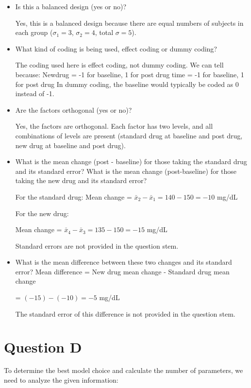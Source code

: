 \documentclass{article}
\begin{document}
\begin{itemize}
\setcounter{enumi}{2}
\item Is this a balanced design (yes or no)?

Yes, this is a balanced design because there are equal numbers of subjects in each group ($\sigma_1 = 3$, $\sigma_2 = 4$, total $\sigma = 5$).

\item What kind of coding is being used, effect coding or dummy coding?

The coding used here is effect coding, not dummy coding. We can tell because:
Newdrug = -1 for baseline, 1 for post drug
time = -1 for baseline, 1 for post drug
In dummy coding, the baseline would typically be coded as 0 instead of -1.

\item Are the factors orthogonal (yes or no)?

Yes, the factors are orthogonal. Each factor has two levels, and all combinations of levels are present (standard drug at baseline and post drug, new drug at baseline and post drug).

\item What is the mean change (post - baseline) for those taking the standard drug and its standard error? What is the mean change (post-baseline) for those taking the new drug and its standard error?

For the standard drug:
Mean change = $\bar{x}_2 - \bar{x}_1 = 140 - 150 = -10$ mg/dL

For the new drug:

Mean change = $\bar{x}_4 - \bar{x}_3 = 135 - 150 = -15$ mg/dL

Standard errors are not provided in the question stem.

\item What is the mean difference between these two changes and its standard error?
Mean difference = New drug mean change - Standard drug mean change

\hphantom{Mean difference} = $(-15) - (-10) = -5$ mg/dL

The standard error of this difference is not provided in the question stem.
\end{itemize}

\newpage
\section{Question D}

To determine the best model choice and calculate the number of parameters, we need to analyze the given information:
\end{document}
